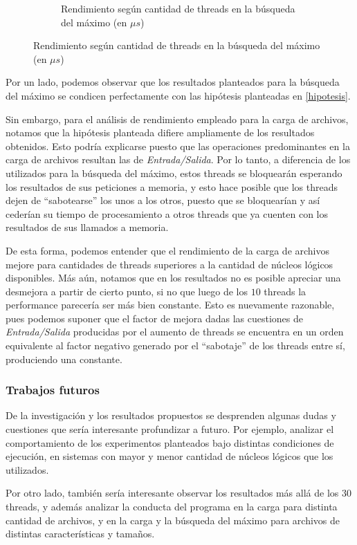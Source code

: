 \documentclass[a4paper]{article}
\begin{document}
\begin{figure}[H]
\begin{subfigure}{.5\textwidth}
        \caption{Rendimiento según cantidad de threads en la búsqueda del máximo (en $\mu s$)}
        \label{res-max}
    \end{subfigure}
\end{figure}

Por un lado, podemos observar que los resultados planteados para la búsqueda del máximo se condicen perfectamente con las hipótesis planteadas en \ref{hipotesis}.

Sin embargo, para el análisis de rendimiento empleado para la carga de archivos, notamos que la hipótesis planteada difiere ampliamente de los resultados obtenidos. Esto podría explicarse puesto que las operaciones predominantes en la carga de archivos resultan las de \textit{Entrada/Salida}. Por lo tanto, a diferencia de los utilizados para la búsqueda del máximo, estos threads se bloquearán esperando los resultados de sus peticiones a memoria, y esto hace posible que los threads dejen de ``sabotearse'' los unos a los otros, puesto que se bloquearían y así cederían su tiempo de procesamiento a otros threads que ya cuenten con los resultados de sus llamados a memoria.

De esta forma, podemos entender que el rendimiento de la carga de archivos mejore para cantidades de threads superiores a la cantidad de núcleos lógicos disponibles. Más aún, notamos que en los resultados no es posible apreciar una desmejora a partir de cierto punto, si no que luego de los $10$ threads la performance parecería ser más bien constante. Esto es nuevamente razonable, pues podemos suponer que el factor de mejora dadas las cuestiones de \textit{Entrada/Salida} producidas por el aumento de threads se encuentra en un orden equivalente al factor negativo generado por el ``sabotaje'' de los threads entre sí, produciendo una constante.

\subsubsection{Trabajos futuros}

De la investigación y los resultados propuestos se desprenden algunas dudas y cuestiones que sería interesante profundizar a futuro. Por ejemplo, analizar el comportamiento de los experimentos planteados bajo distintas condiciones de ejecución, en sistemas con mayor y menor cantidad de núcleos lógicos que los utilizados. 

Por otro lado, también sería interesante observar los resultados más allá de los $30$ threads, y además analizar la conducta del programa en la carga para distinta cantidad de archivos, y en la carga y la búsqueda del máximo para archivos de distintas características y tamaños.
\end{document}
